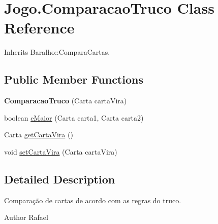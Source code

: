 \hypertarget{class_jogo_1_1_comparacao_truco}{
\section{Jogo.ComparacaoTruco Class Reference}
\label{class_jogo_1_1_comparacao_truco}
}


Inherits Baralho::ComparaCartas.

\subsection*{Public Member Functions}
\begin{DoxyCompactItemize}
\item 
\hypertarget{class_jogo_1_1_comparacao_truco_a165a6bb8bcc7100bffe98716f8c8658a}{
{\bfseries ComparacaoTruco} (Carta cartaVira)}
\label{class_jogo_1_1_comparacao_truco_a165a6bb8bcc7100bffe98716f8c8658a}

\item 
boolean \hyperlink{class_jogo_1_1_comparacao_truco_aa4e26aafb25ba1868df2426e34f554ea}{eMaior} (Carta carta1, Carta carta2)
\item 
Carta \hyperlink{class_jogo_1_1_comparacao_truco_a123b7af4ef31ef32ffccfd6ec02c6083}{getCartaVira} ()
\item 
void \hyperlink{class_jogo_1_1_comparacao_truco_aeddc28cfe339400fef8f3f1962a0813f}{setCartaVira} (Carta cartaVira)
\end{DoxyCompactItemize}


\subsection{Detailed Description}
Comparação de cartas de acordo com as regras do truco. \begin{DoxyAuthor}{Author}
Rafael 
\end{DoxyAuthor}


